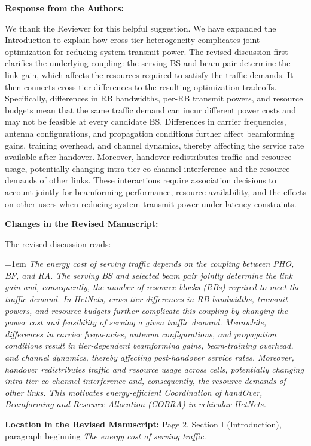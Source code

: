 \documentclass[11pt]{article}
\newenvironment{reviewedit}[1]
{\colorlet{responseblue}{#1}\colorlet{changeblue}{#1}\color{#1}}
{}
\newenvironment{authorresponse}
{\par\noindent\textcolor{responseblue}{\textbf{Response from the Authors:}}\par\color{responseblue}}
{\par}
\newenvironment{manuscriptchanges}
{\par\noindent\textcolor{changeblue}{\textbf{Changes in the Revised Manuscript:}}\par\color{changeblue}}
{\par}
\newcommand{\revisionlocation}[1]{%
  \par\noindent\textbf{Location in the Revised Manuscript:} #1\par
}
\begin{document}
\begin{reviewedit}{blue}
\begin{authorresponse}
We thank the Reviewer for this helpful suggestion. We have expanded the
Introduction to explain how cross-tier heterogeneity complicates joint
optimization for reducing system transmit power. The revised discussion first clarifies the underlying coupling:
the serving BS and beam pair determine the link gain, which affects the
resources required to satisfy the traffic demands. It then connects cross-tier differences
to the resulting optimization tradeoffs.
Specifically, differences in RB bandwidths, per-RB transmit powers, and resource
budgets mean that the same traffic demand can incur different power costs and
may not be feasible at every candidate BS. Differences in carrier frequencies,
antenna configurations, and propagation conditions further affect beamforming
gains, training overhead, and channel dynamics, thereby affecting the service rate available after handover.
Moreover, handover redistributes traffic and resource usage, potentially changing
intra-tier co-channel interference and the resource demands of other links. These
interactions require association decisions to account jointly for beamforming
performance, resource availability, and the effects on other users when reducing
system transmit power under latency constraints.
\end{authorresponse}
\begin{manuscriptchanges}
The revised discussion reads:

{\emergencystretch=1em
\emph{The energy cost of serving traffic depends on the coupling between PHO, BF, and RA.
The serving BS and selected beam pair jointly determine the link gain and, consequently, the number of resource blocks (RBs) required to meet the traffic demand.
In HetNets, cross-tier differences in RB bandwidths, transmit powers, and resource budgets further complicate this coupling by changing the power cost and feasibility of serving a given traffic demand.
Meanwhile, differences in carrier frequencies, antenna configurations, and propagation conditions result in tier-dependent beamforming gains, beam-training overhead, and channel dynamics, thereby affecting post-handover service rates.
Moreover, handover redistributes traffic and resource usage across cells, potentially changing intra-tier co-channel interference and, consequently, the resource demands of other links.
This motivates energy-efficient {C}oordination of hand{O}ver, {B}eamforming and {R}esource {A}llocation (COBRA) in vehicular HetNets.}\par}
\end{manuscriptchanges}
\revisionlocation{Page 2, Section I (Introduction), paragraph beginning
\emph{The energy cost of serving traffic}.}
\end{reviewedit}
\end{document}
